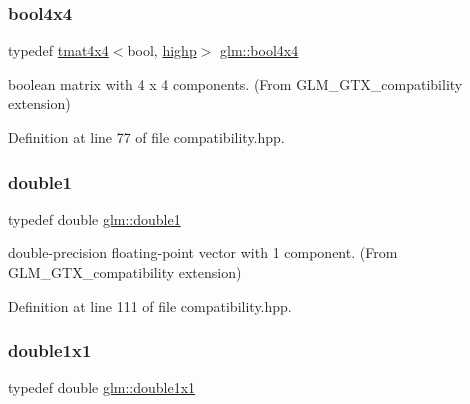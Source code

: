 \subsubsection{\texorpdfstring{bool4x4}{bool4x4}}
{\footnotesize\ttfamily typedef \mbox{\hyperlink{structglm_1_1tmat4x4}{tmat4x4}}$<$bool, \mbox{\hyperlink{namespaceglm_a0f04f086094c747d227af4425893f545ac6f7eab42eacbb10d59a58e95e362074}{highp}}$>$ \mbox{\hyperlink{group__gtx__compatibility_gafd4a5a69fab4d76f91ee75684f3bf2f1}{glm\+::bool4x4}}}



boolean matrix with 4 x 4 components. (From G\+L\+M\+\_\+\+G\+T\+X\+\_\+compatibility extension) 



Definition at line 77 of file compatibility.\+hpp.

\mbox{\label{group__gtx__compatibility_gab8b88350212cea916857cb2f49b8a29f}} 
\subsubsection{\texorpdfstring{double1}{double1}}
{\footnotesize\ttfamily typedef double \mbox{\hyperlink{group__gtx__compatibility_gab8b88350212cea916857cb2f49b8a29f}{glm\+::double1}}}



double-\/precision floating-\/point vector with 1 component. (From G\+L\+M\+\_\+\+G\+T\+X\+\_\+compatibility extension) 



Definition at line 111 of file compatibility.\+hpp.

\mbox{\label{group__gtx__compatibility_ga1c87d3042377335eb050a20ab0ec148a}} 
\subsubsection{\texorpdfstring{double1x1}{double1x1}}
{\footnotesize\ttfamily typedef double \mbox{\hyperlink{group__gtx__compatibility_ga1c87d3042377335eb050a20ab0ec148a}{glm\+::double1x1}}}



